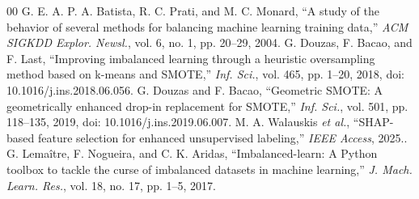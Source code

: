 \documentclass[conference]{IEEEtran}
\begin{document}
\begin{thebibliography}{00}
 G. E. A. P. A. Batista, R. C. Prati, and M. C. Monard, ``A study of the behavior of several methods for balancing machine learning training data,'' \emph{ACM SIGKDD Explor. Newsl.}, vol. 6, no. 1, pp. 20--29, 2004.
 G. Douzas, F. Bacao, and F. Last, ``Improving imbalanced learning through a heuristic oversampling method based on k-means and SMOTE,'' \emph{Inf. Sci.}, vol. 465, pp. 1--20, 2018, doi: 10.1016/j.ins.2018.06.056.
 G. Douzas and F. Bacao, ``Geometric SMOTE: A geometrically enhanced drop-in replacement for SMOTE,'' \emph{Inf. Sci.}, vol. 501, pp. 118--135, 2019, doi: 10.1016/j.ins.2019.06.007.
 M. A. Walauskis \emph{et al.}, ``SHAP-based feature selection for enhanced unsupervised labeling,'' \emph{IEEE Access}, 2025..
 G. Lema\^itre, F. Nogueira, and C. K. Aridas, ``Imbalanced-learn: A Python toolbox to tackle the curse of imbalanced datasets in machine learning,'' \emph{J. Mach. Learn. Res.}, vol. 18, no. 17, pp. 1--5, 2017.
\end{thebibliography}
\end{document}
